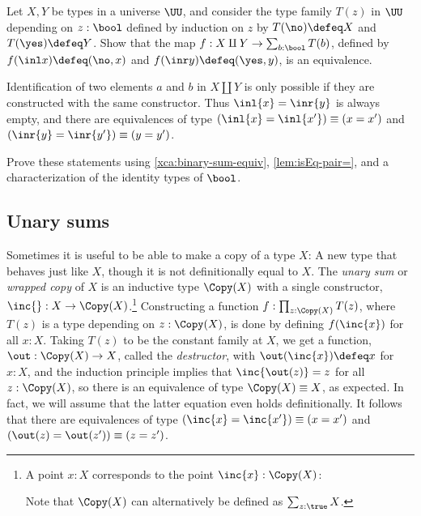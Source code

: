 \begin{xca}\label{xca:binary-sum-equiv}
  Let $X,Y$ be types in a universe $\UU$, and consider the type family
  $T(z)$ in $\UU$ depending on $z:\bool$ defined by induction on $z$ by
  $T(\no)\defeq X$ and $T(\yes) \defeq Y$.
  Show that the map $f : X\amalg Y \to \sum_{b:\bool}T(b)$,
  defined by $f (\inl x) \defeq (\no,x)$ and $f(\inr y) \defeq (\yes,y)$,
  is an equivalence.
\end{xca}

Identification of two elements $a$ and $b$ in $X \amalg Y$ is
only possible if they are constructed with the same constructor.
Thus $\inl{x} = \inr{y}$ is always empty, and there are equivalences of type
$(\inl{x} = \inl{x'}) \equiv (x=x')$ and 
$(\inr{y} = \inr{y'}) \equiv (y=y')$.

\begin{xca}\label{xca:binary-sum-id}
  Prove these statements using \cref{xca:binary-sum-equiv},
  \cref{lem:isEq-pair=}, and a characterization
  of the identity types of $\bool$.
\end{xca}

\subsection{Unary sums}\label{sec:unary-sum-types}

Sometimes it is useful to be able to make a copy of a type $X$:
A new type that behaves just like $X$,
though it is not definitionally equal to $X$.
The \emph{unary sum} or \emph{wrapped copy} of $X$ is an inductive type $\Copy(X)$
with a single constructor, $\inc{} : X \to \Copy(X)$.\footnote{%
  A point $x:X$ corresponds to the point $\inc{x}:\Copy(X)$:\par
  \par
  \noindent Note that $\Copy(X)$ can alternatively be defined as $\sum_{z:\true}X$.}
Constructing a function $f : \prod_{z:\Copy(X)}T(z)$,
where $T(z)$ is a type depending on $z : \Copy(X)$,
is done by defining $f(\inc{x})$ for all $x:X$.
Taking $T(z)$ to be the constant family at $X$,
we get a function, $\out : \Copy(X) \to X$,
called the \emph{destructor},
with $\out(\inc{x}) \defeq x$ for $x:X$,
and the induction principle implies that $\inc{\out(z)} = z$
for all $z:\Copy(X)$, so there is an equivalence of type $\Copy(X) \equiv X$, as expected.
In fact, we will assume that the latter equation even holds definitionally.
It follows that there are equivalences of type $(\inc{x}=\inc{x'}) \equiv (x=x')$ and $(\out(z)=\out(z')) \equiv (z=z')$.

